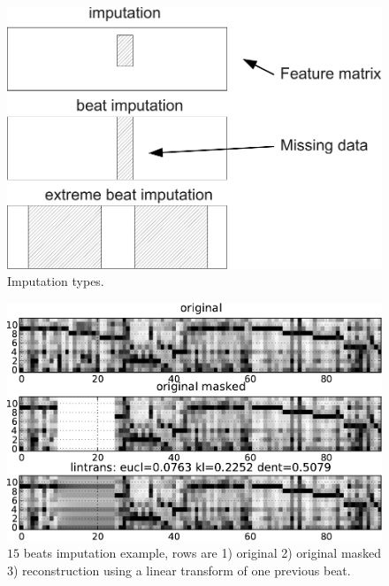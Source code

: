 \documentclass{article}
\begin{document}
\begin{figure}[t]
\begin{center}
\includegraphics[width=.7\columnwidth]{type_imputation}
\end{center}
\caption{Imputation types.
\label{fig:types}}
\end{figure}

\begin{figure}[t]
\begin{center}
\includegraphics[width=.95\columnwidth]{basic}
\end{center}
\caption{$15$ beats imputation example, rows are 1) original 2) original masked
3) reconstruction using a linear transform of one previous beat.
\label{fig:basic}}
\end{figure}

\end{document}
